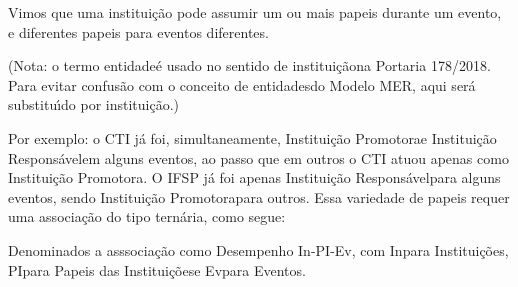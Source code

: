 \documentclass[
12pt,		%
openright,	%
twoside,  %
a4paper,			%
chapter=TITLE,		%
english,			%
french,				%
spanish,			%
brazil				%
]{USPSC-classe/USPSC}
\begin{document}
Vimos que uma institui\c{c}\~ao pode assumir um ou mais papeis durante um evento, e diferentes papeis para eventos diferentes.










(Nota: o termo \textquotedbl entidade\textquotedbl  \'e usado no sentido de \textquotedbl institui\c{c}\~ao\textquotedbl  na Portaria 178/2018. Para evitar confus\~ao com o conceito de \textquotedbl entidades\textquotedbl  do Modelo MER, aqui ser\'a substitu\'{\i}do por \textquotedbl institui\c{c}\~ao\textquotedbl .)










Por exemplo: o CTI j\'a foi, simultaneamente, \textquotedbl Institui\c{c}\~ao Promotora\textquotedbl  e \textquotedbl Institui\c{c}\~ao Respons\'avel\textquotedbl  em alguns eventos, ao passo que em outros o CTI atuou apenas como \textquotedbl Institui\c{c}\~ao Promotora\textquotedbl . O IFSP j\'a foi apenas \textquotedbl Institui\c{c}\~ao Respons\'avel\textquotedbl  para alguns eventos, sendo \textquotedbl Institui\c{c}\~ao Promotora\textquotedbl  para outros. Essa variedade de papeis requer uma associa\c{c}\~ao do tipo tern\'aria, como segue:












Denominados a asssocia\c{c}\~ao como \textquotedbl Desempenho In-PI-Ev\textquotedbl , com \textquotedbl In\textquotedbl  para Institui\c{c}\~oes, \textquotedbl PI\textquotedbl  para \textquotedbl Papeis das Institui\c{c}\~oes\textquotedbl  e \textquotedbl Ev\textquotedbl  para \textquotedbl Eventos\textquotedbl .
\end{document}

